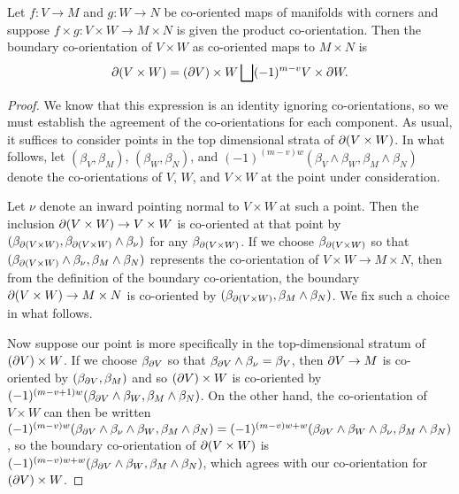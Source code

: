 \begin{proposition}\label{P: boundary of exterior product}
	Let $f \colon V \to M$ and $g \colon W \to N$ be co-oriented maps of manifolds with corners and suppose $f \times g \colon V \times W \to M \times N$ is given the product co-orientation.
	Then the boundary co-orientation of $V \times W$ as co-oriented maps to $M \times N$ is $$\partial(V \times W) = (\partial V) \times W \bigsqcup (-1)^{m-v}V \times \partial W.$$
\end{proposition}

\begin{proof}
	We know that this expression is an identity ignoring co-orientations, so we must establish the agreement of the co-orientations for each component.
	As usual, it suffices to consider points in the top dimensional strata of $\partial(V \times W)$.
	In what follows, let $(\beta_V,\beta_M)$, $(\beta_W,\beta_N)$, and $(-1)^{(m-v)w}(\beta_V \wedge \beta_W,\beta_M \wedge \beta_N)$ denote the co-orientations of $V$, $W$, and $V \times W$ at the point under consideration.

	Let $\nu$ denote an inward pointing normal to $V \times W$ at such a point.
	Then the inclusion $\partial(V \times W) \to V \times W$ is co-oriented at that point by $(\beta_{\partial(V \times W)},\beta_{\partial(V \times W)} \wedge \beta_\nu)$ for any $\beta_{\partial(V \times W)}$.
	If we choose $\beta_{\partial(V \times W)}$ so that $(\beta_{\partial(V \times W)}\wedge\beta_\nu,\beta_M \wedge \beta_N)$ represents the co-orientation of $V \times W \to M \times N$, then from the definition of the boundary co-orientation, the boundary $\partial(V \times W) \to M \times N$ is co-oriented by $(\beta_{\partial(V \times W)},\beta_M \wedge \beta_N)$.
	We fix such a choice in what follows.

	Now suppose our point is more specifically in the top-dimensional stratum of $(\partial V) \times W$.
	If we choose $\beta_{\partial V}$ so that $\beta_{\partial V} \wedge \beta_\nu = \beta_V$, then $\partial V \to M$ is co-oriented by $(\beta_{\partial V},\beta_M)$ and so $(\partial V) \times W$ is co-oriented by $(-1)^{(m-v+1)w}(\beta_{\partial V} \wedge \beta_W,\beta_M \wedge \beta_N)$.
	On the other hand, the co-orientation of $V \times W$ can then be written $(-1)^{(m-v)w}(\beta_{\partial V} \wedge \beta_\nu \wedge \beta_W,\beta_M \wedge \beta_N) = (-1)^{(m-v)w+w}(\beta_{\partial V} \wedge \beta_W \wedge \beta_\nu,\beta_M \wedge \beta_N)$, so the boundary co-orientation of $\partial(V \times W)$ is $(-1)^{(m-v)w+w}(\beta_{\partial V} \wedge \beta_W,\beta_M \wedge \beta_N)$, which agrees with our co-orientation for $(\partial V) \times W$.


\end{proof}
